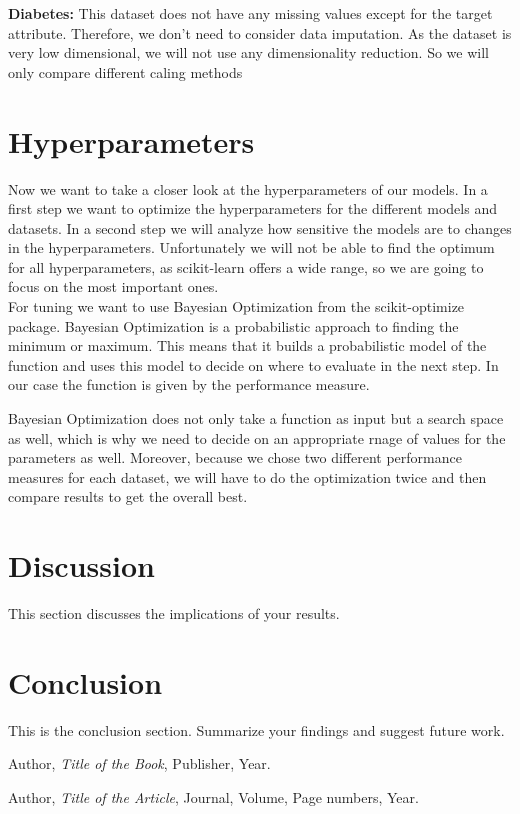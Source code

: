 \documentclass[a4paper,12pt]{article}
\begin{document}
 \textbf{Diabetes:} This dataset does not have any missing values except for the target attribute. Therefore, we 
 don't need to consider data imputation. As the dataset is very low dimensional, we will not use any dimensionality reduction. 
 So we will only compare different caling methods 







\section{Hyperparameters}
Now we want to take a closer look at the hyperparameters of our models. In a first step we want to optimize the hyperparameters for the different models and datasets.
In a second step we will analyze how sensitive the models are to changes in the hyperparameters. Unfortunately we will not be able to find the optimum for all hyperparameters, as scikit-learn offers a wide range, so we are going to focus on the most important ones.\\

For tuning we want to use Bayesian Optimization from the scikit-optimize package. Bayesian Optimization is a probabilistic approach to finding the minimum or maximum. This means that it builds a probabilistic model of the function and uses this model to decide on where to evaluate in the next step. In our case the function is given by the performance measure. 

Bayesian Optimization does not only take a function as input but a search space as well, which is why we need to decide on an appropriate rnage of values for the parameters as well. Moreover, because we chose two different performance measures for each dataset, we will have to do the optimization twice and then compare results to get the overall best.





\section{Discussion}
This section discusses the implications of your results.

\section{Conclusion}
This is the conclusion section. Summarize your findings and suggest future work.

\begin{thebibliography}{9}
Author, \textit{Title of the Book}, Publisher, Year.

Author, \textit{Title of the Article}, Journal, Volume, Page numbers, Year.
\end{thebibliography}
\end{document}
